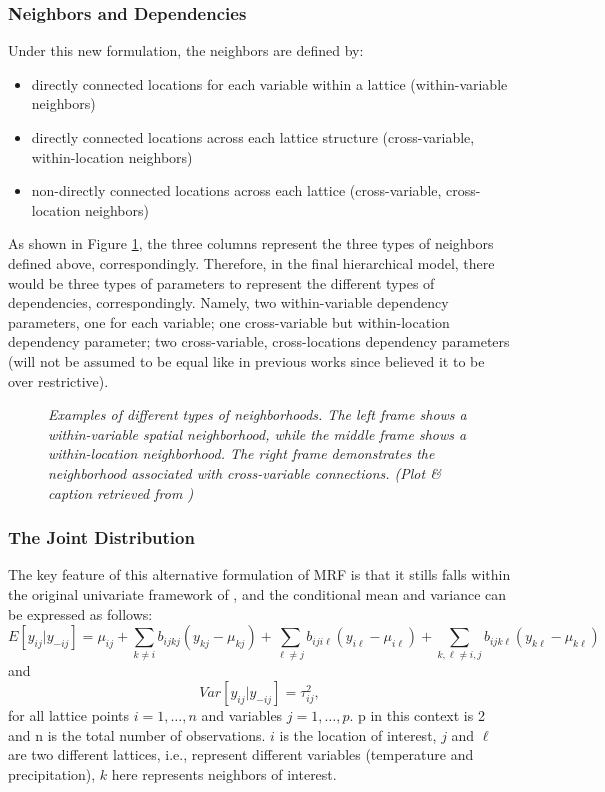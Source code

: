 \documentclass{article}
\begin{document}
\subsubsection{Neighbors and Dependencies}
Under this new formulation, the neighbors are defined by:
\begin{itemize}
    \item directly connected locations for each variable within a lattice (within-variable neighbors)
    \item directly connected locations across each lattice structure (cross-variable, within-location neighbors)
    \item non-directly connected locations across each lattice (cross-variable, cross-location neighbors)
\end{itemize} 
As shown in Figure \ref{fig: neighborhoods}, the three columns represent the three types of neighbors defined above, correspondingly. Therefore, in the final hierarchical model, there would be three types of parameters to represent the different types of dependencies, correspondingly. Namely, two within-variable dependency parameters, one for each variable; one cross-variable but within-location dependency parameter; two cross-variable, cross-locations dependency parameters (will not be assumed to be equal like in previous works since \cite{paper} believed it to be over restrictive). 

\begin{figure}
  \centering
  \caption{\small \emph{Examples of different types of neighborhoods. The left frame shows a within-variable spatial neighborhood, while the middle frame shows a within-location neighborhood. The right frame demonstrates the neighborhood associated with cross-variable connections. (Plot \& caption retrieved from \cite{paper})}}
  \label{fig: neighborhoods}
\end{figure}

\subsubsection{The Joint Distribution}
The key feature of this alternative formulation of MRF is that it stills falls within the original univariate framework of \cite{besag}, and the conditional mean and variance can be expressed as follows:
$$E[y_{ij} | y_{-ij}] = \mu_{ij} + \sum_{k \neq i} b_{ijkj} (y_{kj}-\mu_{kj}) +  \sum_{\ell \neq j} b_{iji\ell} (y_{i \ell}-\mu_{i \ell}) + \sum_{k,\ell \neq i,j} b_{ijk\ell} (y_{k\ell}-\mu_{k\ell})$$
and
$$Var[y_{ij} | y_{-ij}] = \tau_{ij}^2,$$
for all lattice points $i = 1, \dots,n$ and variables $j = 1, \dots,p$. p in this context is 2 and n is the total number of observations. $i$ is the location of interest, $j$ and $\ell$ are two different lattices, i.e., represent different variables (temperature and precipitation), $k$ here represents neighbors of interest.
\end{document}
